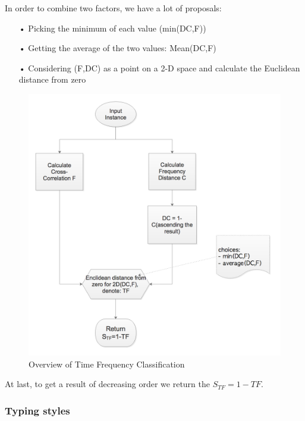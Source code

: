 \documentclass[12pt,a4paper]{article}
\begin{document}
In order to combine two factors, we have a lot of proposals: 
\begin{itemize}
\item[•] Picking the minimum of each value (min(DC,F))
\item[•] Getting the average of the two values:  Mean(DC,F)
\item[•] Considering (F,DC) as a point on a 2-D space and calculate the Euclidean distance from zero\\
\end{itemize}
\begin{figure}[h]
\begin{center}
        \includegraphics[scale=0.6]{tfClassification.png}
        \caption{Overview of Time Frequency Classification}
        \label{fig:8}
\end{center}
\end{figure} \par
\FloatBarrier

At last, to get a result of decreasing order we return the $S_{TF} = 1-TF$. \\
\newpage

\subsubsection{Typing styles}
\end{document}
